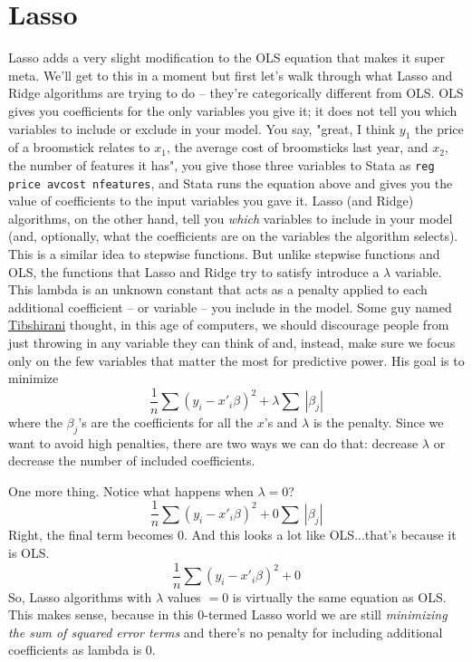 \documentclass{article}                 %
\begin{document}
\section{Lasso}
	Lasso adds a very slight modification to the OLS equation that makes it super meta. We'll get to this in a moment but first let's walk through what Lasso and Ridge algorithms are trying to do -- they're categorically different from OLS.
	OLS gives you coefficients for the only variables you give it; it does not tell you which variables to include or exclude in your model. You say, "great, I think $y_1$ the price of a broomstick relates to $x_1$, the average cost of broomsticks last year, and $x_2$, the number of features it has", you give those three variables to Stata as \texttt{reg price avcost nfeatures}, and Stata runs the equation above and gives you the value of coefficients to the input variables you gave it.
	Lasso (and Ridge) algorithms, on the other hand, tell you \textit{which} variables to include in your model (and, optionally, what the coefficients are on the variables the algorithm selects). This is a similar idea to stepwise functions. But unlike stepwise functions and OLS, the functions that Lasso and Ridge try to satisfy introduce a $\lambda$ variable. This lambda is an unknown constant that acts as a penalty applied to each additional coefficient -- or variable -- you include in the model. Some guy named \href{https://statweb.stanford.edu/~tibs/index.html}{Tibshirani} thought, in this age of computers, we should discourage people from just throwing in any variable they can think of and, instead, make sure we focus only on the few variables that matter the most for predictive power. His goal is to minimize $$ \frac{1}{n} \sum (y_i - x'_i \beta)^2 + \lambda \sum\ | \beta_j | $$ where the $\beta_j$'s are the coefficients for all the $x$'s and $\lambda$ is the penalty. Since we want to avoid high penalties, there are two ways we can do that: decrease $\lambda$ or decrease the number of included coefficients.

	One more thing. Notice what happens when $\lambda = 0$? $$\frac{1}{n} \sum (y_i - x'_i \beta)^2 + 0 \sum\ | \beta_j | $$
	Right, the final term becomes 0. And this looks a lot like OLS...that's because it is OLS. $$\frac{1}{n} \sum (y_i - x'_i \beta)^2 + 0 $$ So, Lasso algorithms with $\lambda$ values $= 0$ is virtually the same equation as OLS. This makes sense, because in this 0-termed Lasso world we are still \textit{minimizing the sum of squared error terms} and there's no penalty for including additional coefficients as lambda is 0.
\end{document}
